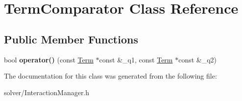 \hypertarget{classTermComparator}{\section{\-Term\-Comparator \-Class \-Reference}
\label{classTermComparator}
}
\subsection*{\-Public \-Member \-Functions}
\begin{DoxyCompactItemize}
\item 
\hypertarget{classTermComparator_a49693a19b255f6943722ea8d2bad9d1e}{bool {\bfseries operator()} (const \hyperlink{classTerm}{\-Term} $\ast$const \&\-\_\-q1, const \hyperlink{classTerm}{\-Term} $\ast$const \&\-\_\-q2)}\label{classTermComparator_a49693a19b255f6943722ea8d2bad9d1e}

\end{DoxyCompactItemize}


\-The documentation for this class was generated from the following file\-:\begin{DoxyCompactItemize}
\item 
solver/\-Interaction\-Manager.\-h\end{DoxyCompactItemize}
